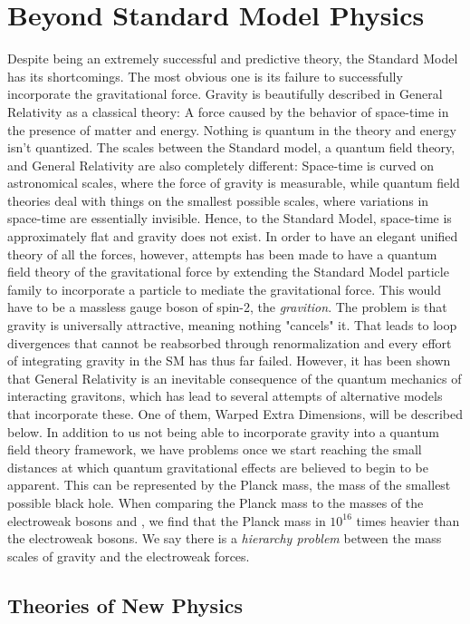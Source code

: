 \section{Beyond Standard Model Physics}
Despite being an extremely successful and predictive theory, the Standard Model has its shortcomings. The most obvious one is its failure to successfully incorporate the gravitational force. Gravity is beautifully described in General Relativity as a classical theory: A force caused by the behavior of space-time in the presence of matter and energy. Nothing is quantum in the theory and energy isn't quantized.
The scales between the Standard model, a quantum field theory, and General Relativity are also completely different: Space-time is curved on astronomical scales, where the force of gravity is measurable, while quantum field theories deal with things on the smallest possible scales, where variations in space-time are essentially invisible. Hence, to the Standard Model, space-time is approximately flat and gravity does not exist. In order to have an elegant unified theory of all the forces, however, attempts has been made to have a quantum field theory of the gravitational force by extending the Standard Model particle family to incorporate a particle to mediate the gravitational force. This would have to be a massless gauge boson of spin-2, the \emph{gravition}. The problem is that gravity is universally attractive, meaning nothing "cancels" it. That leads to loop divergences that cannot be reabsorbed through renormalization and every effort of integrating gravity in the SM has thus far failed. However, it has been shown that General Relativity is an inevitable consequence of the quantum mechanics of interacting gravitons, which has lead to several attempts of alternative models that incorporate these. One of them, Warped Extra Dimensions, will be described below.\newline
In addition to us not being able to incorporate gravity into a quantum field theory framework, we have problems once we start reaching the small distances at which quantum gravitational effects are believed to begin to be apparent. This can be represented by the Planck mass, the mass of the smallest possible black hole. When comparing the Planck mass to the masses of the electroweak bosons \PW and \PZ, we find that the Planck mass in $10^{16}$ times heavier than the electroweak bosons. We say there is a \emph{hierarchy problem} between the mass scales of gravity and the electroweak forces.
\subsection{Theories of New Physics}
